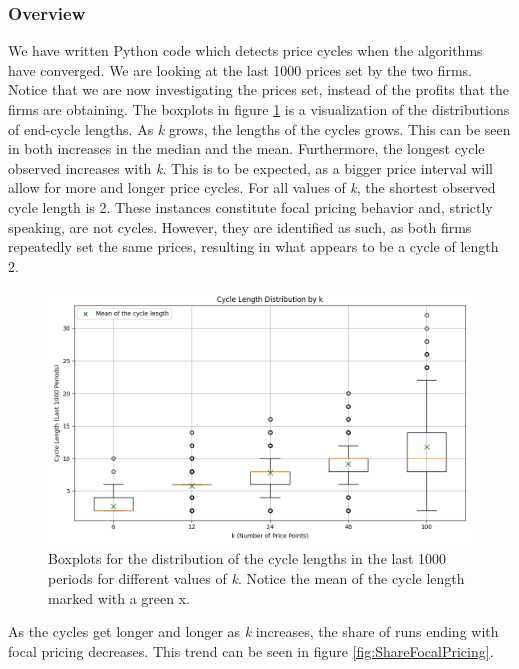 \documentclass{article}
\begin{document}
\subsubsection{Overview}

We have written Python code which detects price cycles when the algorithms have converged. We are looking at the last 1000 prices set by the two firms. Notice that we are now investigating the prices set, instead of the profits that the firms are obtaining. 
\newline
The boxplots in figure \ref{fig:Boxplot} is a visualization of the distributions of end-cycle lengths. As \textit{k} grows, the lengths of the cycles grows. This can be seen in both increases in the median and the mean. Furthermore, the longest cycle observed increases with \textit{k}. This is to be expected, as a bigger price interval will allow for more and longer price cycles.
\newline
For all values of \textit{k}, the shortest observed cycle length is 2. These instances constitute focal pricing behavior and, strictly speaking, are not cycles. However, they are identified as such, as both firms repeatedly set the same prices, resulting in what appears to be a cycle of length 2.

\begin{figure}[H]
    \centering
    \includegraphics[scale = 0.5]{Boxplotv3.png}
    \caption{Boxplots for the distribution of the cycle lengths in the last 1000 periods for different values of \textit{k}. Notice the mean of the cycle length marked with a green x.}
    \label{fig:Boxplot}
\end{figure}

As the cycles get longer and longer as \textit{k} increases, the share of runs ending with focal pricing decreases. This trend can be seen in figure \ref{fig:ShareFocalPricing}.
\end{document}
